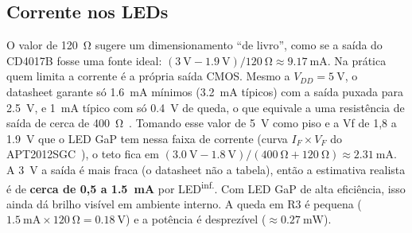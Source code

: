 \documentclass[11pt,a4paper]{article}
\newcommand{\inferido}{\textsuperscript{\textcolor{douradoEsc}{\sffamily inf.}}}
\begin{document}
\subsection{Corrente nos LEDs}
O valor de \SI{120}{\ohm} sugere um dimensionamento “de livro”, como se a saída do
CD4017B fosse uma fonte ideal: $(\SI{3}{\volt} - \SI{1,9}{\volt})/\SI{120}{\ohm} \approx
\SI{9,17}{\milli\ampere}$. Na prática quem limita a corrente é a própria saída CMOS. Mesmo
a $V_{DD} = \SI{5}{\volt}$, o datasheet garante só \SI{1,6}{\milli\ampere} mínimos
(\SI{3,2}{\milli\ampere} típicos) com a saída puxada para \SI{2,5}{\volt}, e
\SI{1}{\milli\ampere} típico com só \SI{0,4}{\volt} de queda, o que equivale a uma
resistência de saída de cerca de \SI{400}{\ohm}~\cite{cd4017}. Tomando esse valor de
\SI{5}{\volt} como piso e a Vf de 1,8 a \SI{1,9}{\volt} que o LED GaP tem nessa faixa de
corrente (curva $I_F \times V_F$ do APT2012SGC~\cite{kingbright}), o teto fica em
$(\SI{3,0}{\volt} - \SI{1,8}{\volt})/(\SI{400}{\ohm} + \SI{120}{\ohm}) \approx
\SI{2,31}{\milli\ampere}$. A \SI{3}{\volt} a saída é mais fraca (o datasheet não a
tabela), então a estimativa realista é de \textbf{cerca de 0,5 a \SI{1,5}{\milli\ampere}}
por LED\inferido. Com LED GaP de alta eficiência, isso ainda dá brilho visível em ambiente
interno. A queda em R3 é pequena ($\SI{1,5}{\milli\ampere} \times \SI{120}{\ohm} =
\SI{0,18}{\volt}$) e a potência é desprezível ($\approx \SI{0,27}{\milli\watt}$).
\end{document}
